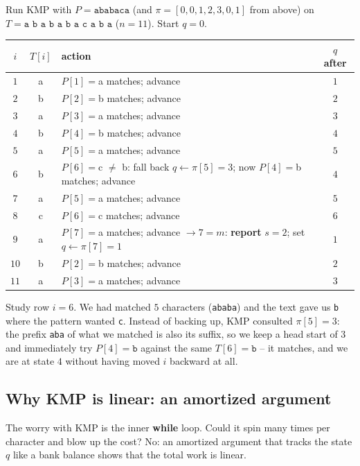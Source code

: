 \begin{labbox}
Run KMP with $P = \texttt{ababaca}$ (and $\pi = [0,0,1,2,3,0,1]$ from above) on
$T = \texttt{a b a b a b a c a b a}$ ($n=11$). Start $q=0$.

\begin{center}
\begin{tabular}{c c l c}
\toprule
$i$ & $T[i]$ & action & $q$ after \\
\midrule
$1$ & a & $P[1]=$a matches; advance & $1$ \\
$2$ & b & $P[2]=$b matches; advance & $2$ \\
$3$ & a & $P[3]=$a matches; advance & $3$ \\
$4$ & b & $P[4]=$b matches; advance & $4$ \\
$5$ & a & $P[5]=$a matches; advance & $5$ \\
$6$ & b & $P[6]=$c $\ne$ b: fall back $q\!\leftarrow\!\pi[5]=3$; now $P[4]=$b matches; advance & $4$ \\
$7$ & a & $P[5]=$a matches; advance & $5$ \\
$8$ & c & $P[6]=$c matches; advance & $6$ \\
$9$ & a & $P[7]=$a matches; advance $\to 7=m$: \textbf{report }$s=2$; set $q\!\leftarrow\!\pi[7]=1$ & $1$ \\
$10$ & b & $P[2]=$b matches; advance & $2$ \\
$11$ & a & $P[3]=$a matches; advance & $3$ \\
\bottomrule
\end{tabular}
\end{center}

Study row $i=6$. We had matched $5$ characters (\texttt{ababa}) and the text gave
us \texttt{b} where the pattern wanted \texttt{c}. Instead of backing up, KMP
consulted $\pi[5]=3$: the prefix \texttt{aba} of what we matched is also its
suffix, so we keep a head start of $3$ and immediately try $P[4]=\texttt{b}$
against the same $T[6]=\texttt{b}$ -- it matches, and we are at state $4$ without
having moved $i$ backward at all.
\end{labbox}

\subsection{Why KMP is linear: an amortized argument}

The worry with KMP is the inner \textbf{while} loop. Could it spin many times per
character and blow up the cost? No: an amortized argument that tracks the state $q$
like a bank balance shows that the total work is linear.

